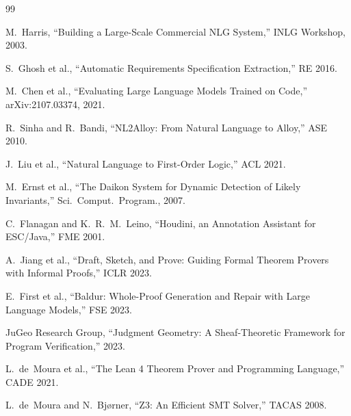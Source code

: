 \documentclass[11pt]{article}
\begin{document}
\begin{thebibliography}{99}

M.~Harris, ``Building a Large-Scale Commercial NLG System,''
INLG Workshop, 2003.

S.~Ghosh et al., ``Automatic Requirements Specification Extraction,''
RE 2016.

M.~Chen et al., ``Evaluating Large Language Models Trained on Code,''
arXiv:2107.03374, 2021.

R.~Sinha and R.~Bandi, ``NL2Alloy: From Natural Language to Alloy,''
ASE 2010.

J.~Liu et al., ``Natural Language to First-Order Logic,'' ACL 2021.

M.~Ernst et al., ``The Daikon System for Dynamic Detection of Likely
Invariants,'' Sci.\ Comput.\ Program., 2007.

C.~Flanagan and K.~R.~M.~Leino, ``Houdini, an Annotation Assistant
for ESC/Java,'' FME 2001.

A.~Jiang et al., ``Draft, Sketch, and Prove: Guiding Formal Theorem
Provers with Informal Proofs,'' ICLR 2023.

E.~First et al., ``Baldur: Whole-Proof Generation and Repair with
Large Language Models,'' FSE 2023.

JuGeo Research Group, ``Judgment Geometry: A Sheaf-Theoretic Framework
for Program Verification,'' 2023.

L.~de~Moura et al., ``The Lean 4 Theorem Prover and Programming
Language,'' CADE 2021.

L.~de~Moura and N.~Bj{\o}rner, ``Z3: An Efficient SMT Solver,''
TACAS 2008.

\end{thebibliography}
\end{document}

